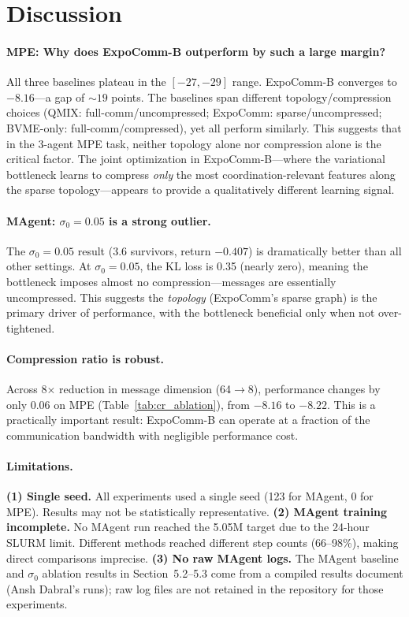 \documentclass{article}
\begin{document}
\section{Discussion}
\label{sec:discussion}

\paragraph{MPE: Why does ExpoComm-B outperform by such a large margin?}
All three baselines plateau in the $[-27, -29]$ range. ExpoComm-B converges to $-8.16$---a gap of ${\sim}19$ points. The baselines span different topology/compression choices (QMIX: full-comm/uncompressed; ExpoComm: sparse/uncompressed; BVME-only: full-comm/compressed), yet all perform similarly. This suggests that in the 3-agent MPE task, neither topology alone nor compression alone is the critical factor. The joint optimization in ExpoComm-B---where the variational bottleneck learns to compress \textit{only} the most coordination-relevant features along the sparse topology---appears to provide a qualitatively different learning signal.

\paragraph{MAgent: $\sigma_0=0.05$ is a strong outlier.}
The $\sigma_0=0.05$ result (3.6 survivors, return $-0.407$) is dramatically better than all other settings. At $\sigma_0=0.05$, the KL loss is 0.35 (nearly zero), meaning the bottleneck imposes almost no compression---messages are essentially uncompressed. This suggests the \textit{topology} (ExpoComm's sparse graph) is the primary driver of performance, with the bottleneck beneficial only when not over-tightened.

\paragraph{Compression ratio is robust.}
Across 8$\times$ reduction in message dimension (64$\to$8), performance changes by only 0.06 on MPE (Table~\ref{tab:cr_ablation}), from $-8.16$ to $-8.22$. This is a practically important result: ExpoComm-B can operate at a fraction of the communication bandwidth with negligible performance cost.

\paragraph{Limitations.}
\textbf{(1) Single seed.} All experiments used a single seed (123 for MAgent, 0 for MPE). Results may not be statistically representative.
\textbf{(2) MAgent training incomplete.} No MAgent run reached the 5.05M target due to the 24-hour SLURM limit. Different methods reached different step counts (66--98\%), making direct comparisons imprecise.
\textbf{(3) No raw MAgent logs.} The MAgent baseline and $\sigma_0$ ablation results in Section~5.2--5.3 come from a compiled results document (Ansh Dabral's runs); raw log files are not retained in the repository for those experiments.
\end{document}
